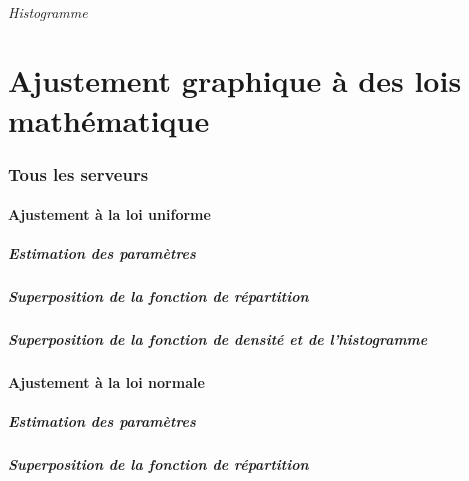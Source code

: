 \documentclass{article}
\begin{document}
\paragraph{Histogramme}
\begin{center}
\end{center}
\paragraph{}

\part{Ajustement graphique à des lois mathématique}

\section{Tous les serveurs}

\subsection{Ajustement à la loi uniforme}

\subsubsection{Estimation des paramètres}
\subsubsection{Superposition de la fonction de répartition}
\subsubsection{Superposition de la fonction de densité et de l'histogramme}

\subsection{Ajustement à la loi normale}

\subsubsection{Estimation des paramètres}
\subsubsection{Superposition de la fonction de répartition}
\end{document}
